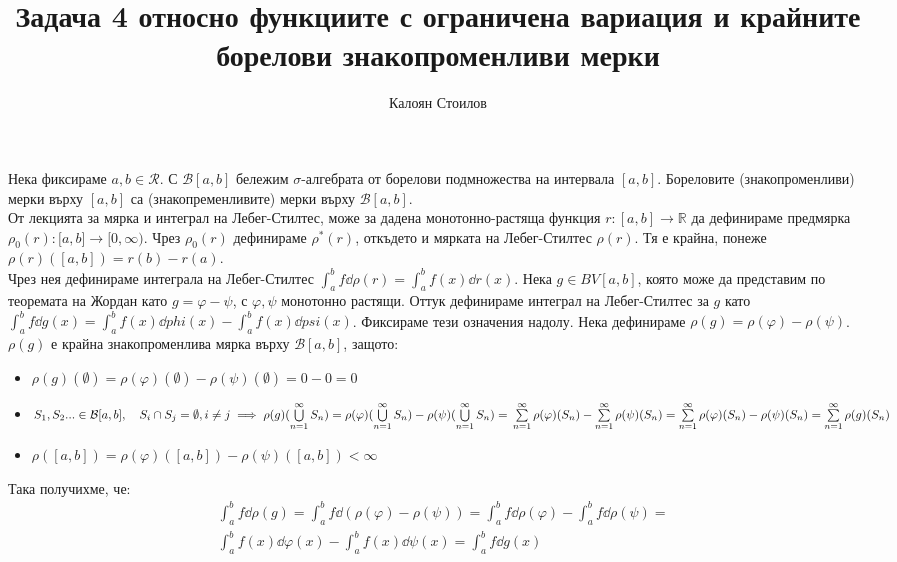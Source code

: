 \documentclass[bulgarian, 12pt]{article}
\title{\textbf{Задача 4} относно функциите с ограничена вариация и крайните борелови знакопроменливи мерки}
\author{Калоян Стоилов}
\begin{document}
\maketitle
Нека фиксираме $a,b \in \mathscr{R}$. С $\mathcal{B}[a, b]$ бележим $\sigma$-алгебрата от борелови подмножества на интервала $[a,b]$.
Бореловите (знакопроменливи) мерки върху $[a,b]$ са (знакопременливите) мерки върху $\mathcal{B}[a, b]$. \\
От лекцията за мярка и интеграл на Лебег-Стилтес, може за дадена монотонно-растяща функция $r:[a,b] \to \mathbb{R}$ да дефинираме предмярка $\rho_0(r):\mathscr[a, b]\to[0,\infty)$.
Чрез $\rho_0(r)$ дефинираме $\rho^*(r)$, откъдето и мярката на Лебег-Стилтес $\rho(r)$.
Тя е крайна, понеже $\rho(r)([a,b])=r(b)-r(a)$. \\
Чрез нея дефинираме интеграла на Лебег-Стилтес $\int_a^b f \dd \rho(r) = \int_a^b f(x) \dd r(x)$.
Нека $g \in BV[a,b]$, която може да представим по теоремата на Жордан като $g=\varphi-\psi$, с $\varphi, \psi$ монотонно растящи. Оттук дефинираме интеграл на Лебег-Стилтес за $g$ като $\int_a^b f \dd g(x) = \int_a^b f(x) \dd phi(x) - \int_a^b f(x) \dd psi(x)$. Фиксираме тези означения надолу.
Нека дефинираме $\rho(g) = \rho(\varphi) - \rho(\psi)$. $\rho(g)$ е крайна знакопроменлива мярка върху $\mathcal{B}[a, b]$, защото:
\begin{itemize}
  \item $\rho(g)(\emptyset) =  \rho(\varphi)(\emptyset) - \rho(\psi)(\emptyset) = 0 - 0 = 0$
  \item $S_1,S_2... \in \mathcal{B}[a, b], \quad S_i \cap S_j =
  \emptyset, i \neq j \implies \rho(g)(\bigcup\limits_{n=1}^\infty S_n) =
  \rho(\varphi)(\bigcup\limits_{n=1}^\infty S_n) - \rho(\psi)(\bigcup\limits_{n=1}^\infty S_n) = \\
  \sum\limits_{n=1}^\infty \rho(\varphi)(S_n) - \sum\limits_{n=1}^\infty \rho(\psi)(S_n) =
  \sum\limits_{n=1}^\infty \rho(\varphi)(S_n) - \rho(\psi)(S_n) =
  \sum\limits_{n=1}^\infty \rho(g)(S_n)$
  \item $\rho([a, b]) = \rho(\varphi)([a, b]) - \rho(\psi)([a, b]) < \infty$
\end{itemize}
Така получихме, че:
\begin{align*}\label{eqn:1}
  \tag{1}
  &\int_a^b f \dd \rho(g) =
  \int_a^b f \dd (\rho(\varphi) - \rho(\psi)) =
  \int_a^b f \dd \rho(\varphi) - \int_a^b f \dd \rho(\psi) = \\
  & \int_a^b f(x) \dd \varphi(x) - \int_a^b f(x) \dd \psi(x) = \int_a^b f \dd g(x)
\end{align*}
\end{document}
